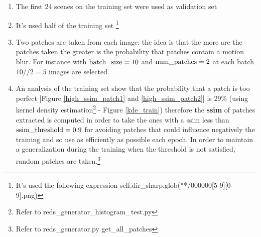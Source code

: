 \begin{enumerate}
    \item The first 24 scenes on the training set were used as validation set
    \item It's used half of the training set \footnote{It's used the following expression self.dir\_sharp.glob(**/000000[5-9][0-9].png)}
    \item Two patches are taken from each image: the idea is that the more are the patches taken the greater is the probability that patches contain a motion blur. For instance with $\textnormal{batch\_size}=10$ and $\textnormal{num\_patches}=2$ at each batch $10//2=5$ images are selected.
    \item An analysis of the training set show that the probability that a patch is too perfect [Figure \ref{high_ssim_patch1} and \ref{high_ssim_patch2}] is 29\% (using kernel density estimation\footnote{Refer to reds\_generator\_histogram\_test.py} - Figure \ref{kde_train}) therefore the \textbf{ssim} of patches extracted is computed in order to take the ones with a ssim less than $\textnormal{ssim\_threshold} = 0.9$ for avoiding patches that could influence negatively the training and so use as efficiently as possible each epoch.
    In order to maintain a generalization during the training when the threshold is not satisfied, random patches are taken.\footnote{Refer to reds\_generator.py get\_all\_patches}


\end{enumerate}
